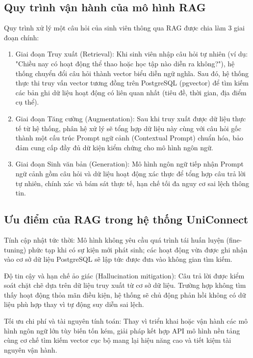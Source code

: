 \subsection{Quy trình vận hành của mô hình RAG}

Quy trình xử lý một câu hỏi của sinh viên thông qua RAG được chia làm 3 giai đoạn chính:

\begin{enumerate}
    \item Giai đoạn Truy xuất (Retrieval):
    Khi sinh viên nhập câu hỏi tự nhiên (ví dụ: "Chiều nay có hoạt động thể thao hoặc học tập nào diễn ra không?"), hệ thống chuyển đổi câu hỏi thành vector biểu diễn ngữ nghĩa. Sau đó, hệ thống thực thi truy vấn vector tương đồng trên PostgreSQL (pgvector) để tìm kiếm các bản ghi dữ liệu hoạt động có liên quan nhất (tiêu đề, thời gian, địa điểm cụ thể).
    
    \item Giai đoạn Tăng cường (Augmentation):
    Sau khi truy xuất được dữ liệu thực tế từ hệ thống, phân hệ xử lý sẽ tổng hợp dữ liệu này cùng với câu hỏi gốc thành một cấu trúc Prompt ngữ cảnh (Contextual Prompt) chuẩn hóa, bảo đảm cung cấp đầy đủ dữ kiện kiểm chứng cho mô hình ngôn ngữ.
    
    \item Giai đoạn Sinh văn bản (Generation):
    Mô hình ngôn ngữ tiếp nhận Prompt ngữ cảnh gồm câu hỏi và dữ liệu hoạt động xác thực để tổng hợp câu trả lời tự nhiên, chính xác và bám sát thực tế, hạn chế tối đa nguy cơ sai lệch thông tin.
\end{enumerate}

\subsection{Ưu điểm của RAG trong hệ thống UniConnect}

Tính cập nhật tức thời: Mô hình không yêu cầu quá trình tái huấn luyện (fine-tuning) phức tạp khi có sự kiện mới phát sinh; các hoạt động vừa được ghi nhận vào cơ sở dữ liệu PostgreSQL sẽ lập tức được đưa vào không gian tìm kiếm.

Độ tin cậy và hạn chế ảo giác (Hallucination mitigation): Câu trả lời được kiểm soát chặt chẽ dựa trên dữ liệu truy xuất từ cơ sở dữ liệu. Trường hợp không tìm thấy hoạt động thỏa mãn điều kiện, hệ thống sẽ chủ động phản hồi không có dữ liệu phù hợp thay vì tự động suy diễn sai lệch.

Tối ưu chi phí và tài nguyên tính toán: Thay vì triển khai hoặc vận hành các mô hình ngôn ngữ lớn tùy biến tốn kém, giải pháp kết hợp API mô hình nền tảng cùng cơ chế tìm kiếm vector cục bộ mang lại hiệu năng cao và tiết kiệm tài nguyên vận hành\cite{karpukhin2020dense}.

